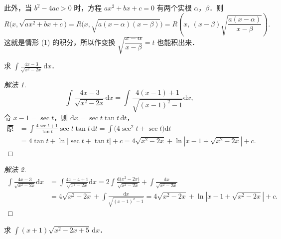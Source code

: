 此外，当 $b^{2}-4ac > 0$ 时，方程 $ax^{2}+bx+c = 0$ 有两个实根 $\alpha$，$\beta$．则
\[
R\big(x,\sqrt{ax^{2}+bx+c}\big)
= R\big(x,\sqrt{a(x-\alpha)(x-\beta)}\big)
= R\left(x,\ (x-\beta)\sqrt{\frac{a(x-\alpha)}{x-\beta}}\right).
\]
这就是情形 (1) 的积分，所以作变换 $\sqrt{\dfrac{x-\alpha}{x-\beta}} = t$ 也能积出来．

\begin{example}\label{ex:6-2-32}
求 $\displaystyle\int\frac{4x-3}{\sqrt{x^{2}-2x}}\,\mathrm{d}x$．
\end{example}

\begin{proof}[解法 1]
\[
\int\frac{4x-3}{\sqrt{x^{2}-2x}}\mathrm{d}x
= \int\frac{4(x-1)+1}{\sqrt{(x-1)^{2}-1}}\mathrm{d}x,
\]
令 $x-1 = \sec t$，则 $\mathrm{d}x = \sec t\tan t\,\mathrm{d}t$，
\[
\begin{aligned}
\text{原式} &= \int\frac{4\sec t+1}{\tan t}\sec t\tan t\,\mathrm{d}t
= \int\big(4\sec^{2}t+\sec t\big)\mathrm{d}t\\
&= 4\tan t+\ln|\sec t+\tan t|+c
= 4\sqrt{x^{2}-2x}+\ln\left|x-1+\sqrt{x^{2}-2x}\right|+c.
\end{aligned}
\]
\end{proof}

\begin{proof}[解法 2]
\[
\begin{aligned}
\int\frac{4x-3}{\sqrt{x^{2}-2x}}\mathrm{d}x
&= \int\frac{4x-4+1}{\sqrt{x^{2}-2x}}\mathrm{d}x
= 2\int\frac{\mathrm{d}\big(x^{2}-2x\big)}{\sqrt{x^{2}-2x}}+\int\frac{\mathrm{d}x}{\sqrt{x^{2}-2x}}\\
&= 4\sqrt{x^{2}-2x}+\int\frac{\mathrm{d}x}{\sqrt{(x-1)^{2}-1}}
= 4\sqrt{x^{2}-2x}+\ln\left|x-1+\sqrt{x^{2}-2x}\right|+c.
\end{aligned}
\]
\end{proof}

\begin{example}\label{ex:6-2-33}
求 $\displaystyle\int(x+1)\sqrt{x^{2}-2x+5}\,\mathrm{d}x$．
\end{example}

